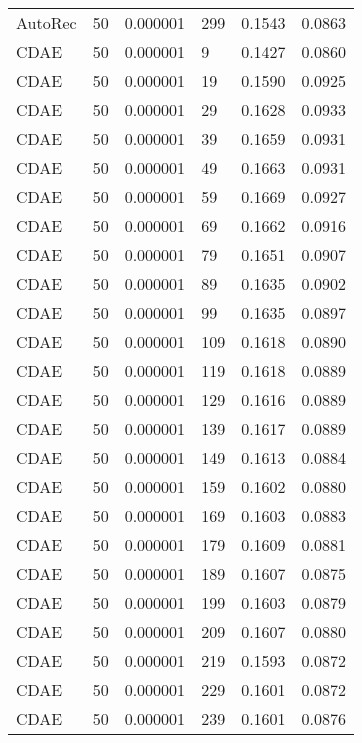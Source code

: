 \begin{tabular}{llrlrr}
 AutoRec &   50 &  0.000001 &   299 &  0.1543 &       0.0863 \\
    CDAE &   50 &  0.000001 &     9 &  0.1427 &       0.0860 \\
    CDAE &   50 &  0.000001 &    19 &  0.1590 &       0.0925 \\
    CDAE &   50 &  0.000001 &    29 &  0.1628 &       0.0933 \\
    CDAE &   50 &  0.000001 &    39 &  0.1659 &       0.0931 \\
    CDAE &   50 &  0.000001 &    49 &  0.1663 &       0.0931 \\
    CDAE &   50 &  0.000001 &    59 &  0.1669 &       0.0927 \\
    CDAE &   50 &  0.000001 &    69 &  0.1662 &       0.0916 \\
    CDAE &   50 &  0.000001 &    79 &  0.1651 &       0.0907 \\
    CDAE &   50 &  0.000001 &    89 &  0.1635 &       0.0902 \\
    CDAE &   50 &  0.000001 &    99 &  0.1635 &       0.0897 \\
    CDAE &   50 &  0.000001 &   109 &  0.1618 &       0.0890 \\
    CDAE &   50 &  0.000001 &   119 &  0.1618 &       0.0889 \\
    CDAE &   50 &  0.000001 &   129 &  0.1616 &       0.0889 \\
    CDAE &   50 &  0.000001 &   139 &  0.1617 &       0.0889 \\
    CDAE &   50 &  0.000001 &   149 &  0.1613 &       0.0884 \\
    CDAE &   50 &  0.000001 &   159 &  0.1602 &       0.0880 \\
    CDAE &   50 &  0.000001 &   169 &  0.1603 &       0.0883 \\
    CDAE &   50 &  0.000001 &   179 &  0.1609 &       0.0881 \\
    CDAE &   50 &  0.000001 &   189 &  0.1607 &       0.0875 \\
    CDAE &   50 &  0.000001 &   199 &  0.1603 &       0.0879 \\
    CDAE &   50 &  0.000001 &   209 &  0.1607 &       0.0880 \\
    CDAE &   50 &  0.000001 &   219 &  0.1593 &       0.0872 \\
    CDAE &   50 &  0.000001 &   229 &  0.1601 &       0.0872 \\
    CDAE &   50 &  0.000001 &   239 &  0.1601 &       0.0876 \\

\end{tabular}
